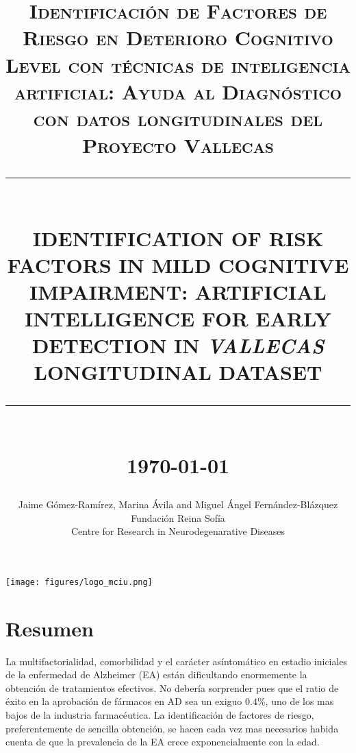 \documentclass[11pt]{article}
\theoremstyle{definition}
\theoremstyle{remark}
\newcommand{\HRule}[1]{\rule{\linewidth}{#1}}
\begin{document}

\title{ \normalsize \textsc{Identificación de Factores de Riesgo en Deterioro Cognitivo Level con técnicas de inteligencia artificial: Ayuda al Diagnóstico con datos longitudinales del Proyecto Vallecas}
		\\ [2.0cm]
		\HRule{0.5pt} \\
		\LARGE \textbf{\uppercase{Identification of risk factors in Mild Cognitive Impairment: Artificial intelligence   for early detection in \emph{Vallecas} longitudinal dataset}}
		\HRule{2pt} \\ [0.5cm]
		\normalsize \today \vspace*{5\baselineskip}}

\date{}

\author{
		Jaime G\'omez-Ram\'irez, Marina \'Avila and Miguel \'Angel Fern\'andez-Bl\'azquez   \\
		Fundaci\'on Reina Sof\'ia \\
		Centre for Research in Neurodegenarative Diseases }

\maketitle
\begin{center}
\texttt{[image: figures/logo\_mciu.png]}
\end{center}
\newpage
\tableofcontents
\newpage

\sectionfont{\scshape}



\section*{Resumen}

La multifactorialidad, comorbilidad y el carácter asíntomático en estadio iniciales de la enfermedad de Alzheimer (EA) están dificultando enormemente la obtención de tratamientos efectivos. No debería sorprender pues que el ratio de éxito en la aprobación de fármacos en AD sea un exiguo $0.4\%$, uno de los mas bajos de la industria farmacéutica. 
La identificación de factores de riesgo, preferentemente de sencilla obtención, se hacen cada vez mas necesarios habida cuenta de que la prevalencia de la EA crece exponencialmente con la edad. 
\end{document}
